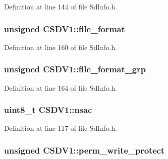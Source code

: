 Definition at line 144 of file Sd\+Info.\+h.

\subsubsection[{\texorpdfstring{file\+\_\+format}{file\_format}}]{\setlength{\rightskip}{0pt plus 5cm}unsigned C\+S\+D\+V1\+::file\+\_\+format}\hypertarget{struct_c_s_d_v1_a537754d4987f7c51d5a67b66d8870cf5}{}\label{struct_c_s_d_v1_a537754d4987f7c51d5a67b66d8870cf5}


Definition at line 160 of file Sd\+Info.\+h.

\subsubsection[{\texorpdfstring{file\+\_\+format\+\_\+grp}{file\_format\_grp}}]{\setlength{\rightskip}{0pt plus 5cm}unsigned C\+S\+D\+V1\+::file\+\_\+format\+\_\+grp}\hypertarget{struct_c_s_d_v1_a39a7305faa36816b35635cbc6a6810dd}{}\label{struct_c_s_d_v1_a39a7305faa36816b35635cbc6a6810dd}


Definition at line 164 of file Sd\+Info.\+h.

\subsubsection[{\texorpdfstring{nsac}{nsac}}]{\setlength{\rightskip}{0pt plus 5cm}uint8\+\_\+t C\+S\+D\+V1\+::nsac}\hypertarget{struct_c_s_d_v1_aa7089849926dbb8443cc9c499cd4af55}{}\label{struct_c_s_d_v1_aa7089849926dbb8443cc9c499cd4af55}


Definition at line 117 of file Sd\+Info.\+h.

\subsubsection[{\texorpdfstring{perm\+\_\+write\+\_\+protect}{perm\_write\_protect}}]{\setlength{\rightskip}{0pt plus 5cm}unsigned C\+S\+D\+V1\+::perm\+\_\+write\+\_\+protect}\hypertarget{struct_c_s_d_v1_a56bd241d539d5a48b97a64587908e55d}{}\label{struct_c_s_d_v1_a56bd241d539d5a48b97a64587908e55d}


